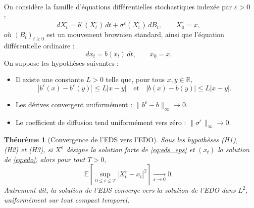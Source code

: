 \documentclass[12pt,a4paper]{article}
\newtheorem{theorem}{Théorème}[section]
\theoremstyle{remark}
\begin{document}
On considère la famille d'équations différentielles stochastiques indexée par $\varepsilon > 0$ :
\begin{equation}
dX^\varepsilon_t = b^\varepsilon(X^\varepsilon_t)\,dt + \sigma^\varepsilon(X^\varepsilon_t)\,dB_t, \qquad X^\varepsilon_0 = x,
\label{eq:eds_eps}
\end{equation}
où $(B_t)_{t \geq 0}$ est un mouvement brownien standard, ainsi que l'équation différentielle ordinaire :
\begin{equation}
dx_t = b(x_t)\,dt, \qquad x_0 = x.
\label{eq:edo}
\end{equation}
On suppose les hypothèses suivantes :
\begin{itemize}
  \item[\textbf{(H1)}] Il existe une constante $L > 0$ telle que, pour tous $x, y \in \mathbb{R}$,
  \[
    |b^\varepsilon(x) - b^\varepsilon(y)| \leq L|x - y|
    \quad \text{et} \quad
    |b(x) - b(y)| \leq L|x - y|.
  \]
  \item[\textbf{(H2)}] Les dérives convergent uniformément : $\|b^\varepsilon - b\|_\infty \to 0$.
  \item[\textbf{(H3)}] Le coefficient de diffusion tend uniformément vers zéro : $\|\sigma^\varepsilon\|_\infty \to 0$.
\end{itemize}
 
\begin{theorem}[Convergence de l'EDS vers l'EDO]
Sous les hypothèses \textnormal{(H1)}, \textnormal{(H2)} et \textnormal{(H3)}, si $X^\varepsilon$ désigne la solution forte de \eqref{eq:eds_eps} et $(x_t)$ la solution de \eqref{eq:edo}, alors pour tout $T > 0$,
\[
  \mathbb{E}\!\left[\sup_{0 \leq t \leq T} |X^\varepsilon_t - x_t|^2\right] \xrightarrow[\varepsilon \to 0]{} 0.
\]
Autrement dit, la solution de l'EDS converge vers la solution de l'EDO dans $L^2$, uniformément sur tout compact temporel.
\end{theorem}
 
\end{document}
